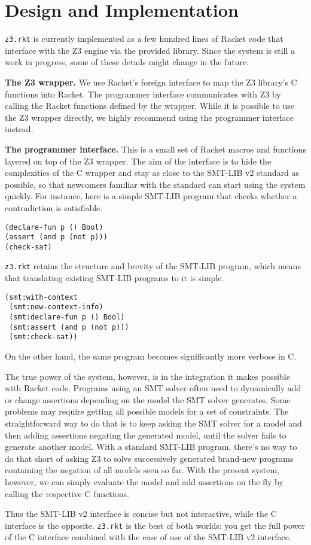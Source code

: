 \section{Design and Implementation}

\texttt{z3.rkt} is currently implemented as a few hundred lines of Racket code
that interface with the Z3 engine via the provided library. Since the system is
still a work in progress, some of these details might change in the future.

\textbf{The Z3 wrapper.} We use Racket's foreign interface \cite{racket/foreign}
to map the Z3 library's C functions into Racket. The programmer interface
communicates with Z3 by calling the Racket functions defined by the
wrapper. While it is possible to use the Z3 wrapper directly, we highly
recommend using the programmer interface instead.

\textbf{The programmer interface.} This is a small set of Racket macros and
functions layered on top of the Z3 wrapper. The aim of the interface is to hide
the complexities of the C wrapper and stay as close to the SMT-LIB v2 standard
\cite{smtlib2:10} as possible, so that newcomers familiar with the standard can
start using the system quickly. For instance, here is a simple SMT-LIB program
that checks whether a contradiction is satisfiable.

\begin{verbatim}
(declare-fun p () Bool)
(assert (and p (not p)))
(check-sat)
\end{verbatim}

\texttt{z3.rkt} retains the structure and brevity of the SMT-LIB program, which
means that translating existing SMT-LIB programs to it is simple.

\begin{verbatim}
(smt:with-context
 (smt:new-context-info)
 (smt:declare-fun p () Bool)
 (smt:assert (and p (not p)))
 (smt:check-sat))
\end{verbatim}

On the other hand, the same program becomes significantly more verbose in C.

The true power of the system, however, is in the integration it makes possible
with Racket code. Programs using an SMT solver often need to dynamically add or
change assertions depending on the model the SMT solver generates. Some problems
may require getting all possible models for a set of constraints. The
straightforward way to do that is to keep asking the SMT solver for a model and
then adding assertions negating the generated model, until the solver fails to
generate another model. With a standard SMT-LIB program, there's no way to do
that short of asking Z3 to solve successively generated brand-new programs
containing the negation of all models seen so far. With the present system,
however, we can simply evaluate the model and add assertions on the fly by
calling the respective C functions.

Thus the SMT-LIB v2 interface is concise but not interactive, while the C
interface is the opposite. \texttt{z3.rkt} is the best of both worlds: you get
the full power of the C interface combined with the ease of use of the SMT-LIB
v2 interface.
